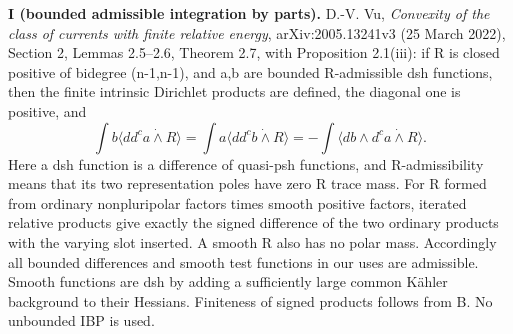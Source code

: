 \documentclass[
]{article}
\begin{document}
\textbf{I (bounded admissible integration by parts).} D.-V. Vu,
\emph{Convexity of the class of currents with finite relative energy},
arXiv:2005.13241v3 (25 March 2022), Section 2, Lemmas 2.5--2.6, Theorem
2.7, with Proposition 2.1(iii): if R is closed positive of bidegree
(n-1,n-1), and a,b are bounded R-admissible dsh functions, then the
finite intrinsic Dirichlet products are defined, the diagonal one is
positive, and \[
\int b\langle dd^ca\mathbin{\dot\wedge}R\rangle
=\int a\langle dd^cb\mathbin{\dot\wedge}R\rangle
=-\int\langle db\wedge d^ca\mathbin{\dot\wedge}R\rangle.\tag{I}
\] Here a dsh function is a difference of quasi-psh functions, and
R-admissibility means that its two representation poles have zero R
trace mass. For R formed from ordinary nonpluripolar factors times
smooth positive factors, iterated relative products give exactly the
signed difference of the two ordinary products with the varying slot
inserted. A smooth R also has no polar mass. Accordingly all bounded
differences and smooth test functions in our uses are admissible. Smooth
functions are dsh by adding a sufficiently large common Kähler
background to their Hessians. Finiteness of signed products follows from
B. No unbounded IBP is used.
\end{document}
